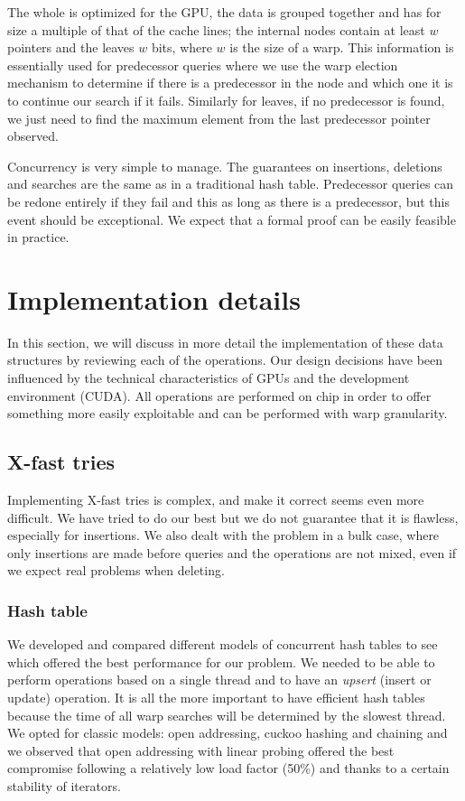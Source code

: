 \documentclass[conference]{IEEEtran}
\begin{document}
The whole is optimized for the GPU, the data is grouped together and has for size a multiple of that of the cache lines; the internal nodes contain at least $w$ pointers and the leaves $w$ bits, where $w$ is the size of a warp. This information is essentially used for predecessor queries where we use the warp election mechanism to determine if there is a predecessor in the node and which one it is to continue our search if it fails. Similarly for leaves, if no predecessor is found, we just need to find the maximum element from the last predecessor pointer observed.

Concurrency is very simple to manage. The guarantees on insertions, deletions and searches are the same as in a traditional hash table. Predecessor queries can be redone entirely if they fail and this as long as there is a predecessor, but this event should be exceptional. We expect that a formal proof can be easily feasible in practice.

\section{Implementation details}

In this section, we will discuss in more detail the implementation of these data structures by reviewing each of the operations. Our design decisions have been influenced by the technical characteristics of GPUs and the development environment (CUDA). All operations are performed on chip in order to offer something more easily exploitable and can be performed with warp granularity.

\subsection{X-fast tries}

Implementing X-fast tries is complex, and make it correct seems even more difficult. We have tried to do our best but we do not guarantee that it is flawless, especially for insertions. We also dealt with the problem in a bulk case, where only insertions are made before queries and the operations are not mixed, even if we expect real problems when deleting.

\subsubsection{Hash table}

We developed and compared different models of concurrent hash tables to see which offered the best performance for our problem. We needed to be able to perform operations based on a single thread and to have an \textit{upsert} (insert or update) operation. It is all the more important to have efficient hash tables because the time of all warp searches will be determined by the slowest thread. We opted for classic models: open addressing, cuckoo hashing and chaining and we observed that open addressing with linear probing offered the best compromise following a relatively low load factor (50\%) and thanks to a certain stability of iterators.
\end{document}
